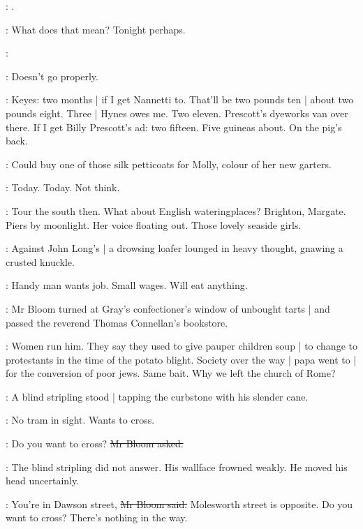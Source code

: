 \Bloom:
.

\BloomInt:
What does that  mean?
Tonight perhaps.

\BloomInt:

\BloomInt:
Doesn't go properly.

\BloomInt:
Keyes: two months |
if I get Nannetti to.
That'll be two pounds ten |
about two pounds eight.
Three |
Hynes owes me.
Two eleven.
Prescott's dyeworks van over there.
If I get Billy Prescott's ad:
two fifteen.
Five guineas about.
On the pig's back.

\BloomInt:
Could buy one of those silk petticoats for Molly,
colour of her new garters.

\BloomInt:
Today.
Today.
Not think.

\BloomInt:
Tour the south then.
What about English wateringplaces?
Brighton, Margate.
Piers by moonlight.
Her voice floating out.
Those lovely seaside girls.

:
Against John Long's |
a drowsing loafer lounged in heavy thought,
gnawing a crusted knuckle.

\BloomInt:
Handy man wants job.
Small wages.
Will eat anything.

:
Mr Bloom turned at Gray's confectioner's window of unbought tarts |
and passed the reverend Thomas Connellan's bookstore.

\BloomInt:
Women run him.
They say they used to give pauper children soup |
to change to protestants in the time of the potato blight.
Society over the way |
papa went to |
for the conversion of poor jews.
Same bait.
Why we left the church of Rome?

:
A blind stripling stood |
tapping the curbstone with his slender cane.

\BloomInt:
No tram in sight.
Wants to cross.

\Bloom:
Do you want to cross?
\sout{Mr Bloom asked.}

:
The blind stripling did not answer.
His wallface frowned weakly.
He moved his head uncertainly.

\Bloom:
You're in Dawson street,
\sout{Mr Bloom said.}
Molesworth street is opposite.
Do you want to cross?
There's nothing in the way.

